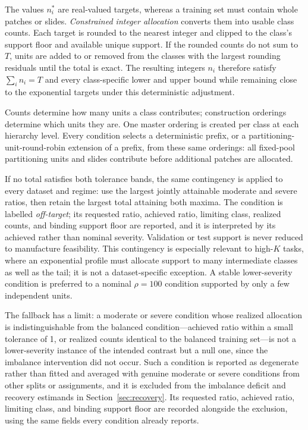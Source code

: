 \documentclass[11pt]{article}
\begin{document}
The values $n_i^*$ are real-valued targets, whereas a training set must contain whole patches or slides. \emph{Constrained integer allocation} converts them into usable class counts. Each target is rounded to the nearest integer and clipped to the class's support floor and available unique support. If the rounded counts do not sum to $T$, units are added to or removed from the classes with the largest rounding residuals until the total is exact. The resulting integers $n_i$ therefore satisfy $\sum_i n_i=T$ and every class-specific lower and upper bound while remaining close to the exponential targets under this deterministic adjustment.

Counts determine how many units a class contributes; construction orderings determine which units they are. One master ordering is created per class at each hierarchy level. Every condition selects a deterministic prefix, or a partitioning-unit-round-robin extension of a prefix, from these same orderings: all fixed-pool partitioning units and slides contribute before additional patches are allocated.

If no total satisfies both tolerance bands, the same contingency is applied to every dataset and regime: use the largest jointly attainable moderate and severe ratios, then retain the largest total attaining both maxima. The condition is labelled \emph{off-target}; its requested ratio, achieved ratio, limiting class, realized counts, and binding support floor are reported, and it is interpreted by its achieved rather than nominal severity. Validation or test support is never reduced to manufacture feasibility. This contingency is especially relevant to high-$K$ tasks, where an exponential profile must allocate support to many intermediate classes as well as the tail; it is not a dataset-specific exception. A stable lower-severity condition is preferred to a nominal $\rho=100$ condition supported by only a few independent units.

The fallback has a limit: a moderate or severe condition whose realized allocation is indistinguishable from the balanced condition---achieved ratio within a small tolerance of 1, or realized counts identical to the balanced training set---is not a lower-severity instance of the intended contrast but a null one, since the imbalance intervention did not occur. Such a condition is reported as degenerate rather than fitted and averaged with genuine moderate or severe conditions from other splits or assignments, and it is excluded from the imbalance deficit and recovery estimands in Section~\ref{sec:recovery}. Its requested ratio, achieved ratio, limiting class, and binding support floor are recorded alongside the exclusion, using the same fields every condition already reports.
\end{document}
